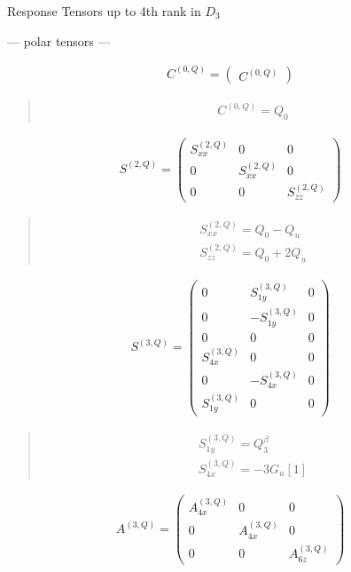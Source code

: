 \documentclass[fleqn,10pt]{jsarticle}
\begin{document}
\setcounter{MaxMatrixCols}{16}

\begin{center}
\LARGE
Response Tensors up to 4th rank in $D_{3}$
\end{center}
\begin{center}\LARGE --- polar tensors ---\end{center}
\begin{align*}
C^{(0,Q)} = \begin{pmatrix} C^{(0,Q)} \end{pmatrix}
\end{align*}
\begin{quote}
\begin{align*}
& C^{(0,Q)} = Q_{0}
\end{align*}
\end{quote}
\begin{align*}
S^{(2,Q)} = \begin{pmatrix} S^{(2,Q)}_{xx} & 0 & 0 \\ 0 & S^{(2,Q)}_{xx} & 0 \\ 0 & 0 & S^{(2,Q)}_{zz} \end{pmatrix}
\end{align*}
\begin{quote}
\begin{align*}
& S^{(2,Q)}_{xx} = Q_{0} - Q_{u} \\
& S^{(2,Q)}_{zz} = Q_{0} + 2 Q_{u}
\end{align*}
\end{quote}
\begin{align*}
S^{(3,Q)} = \begin{pmatrix} 0 & S^{(3,Q)}_{1y} & 0 \\ 0 & - S^{(3,Q)}_{1y} & 0 \\ 0 & 0 & 0 \\ S^{(3,Q)}_{4x} & 0 & 0 \\ 0 & - S^{(3,Q)}_{4x} & 0 \\ S^{(3,Q)}_{1y} & 0 & 0 \end{pmatrix}
\end{align*}
\begin{quote}
\begin{align*}
& S^{(3,Q)}_{1y} = Q_{3}^{\beta} \\
& S^{(3,Q)}_{4x} = - 3 G_{u}[1]
\end{align*}
\end{quote}
\begin{align*}
A^{(3,Q)} = \begin{pmatrix} A^{(3,Q)}_{4x} & 0 & 0 \\ 0 & A^{(3,Q)}_{4x} & 0 \\ 0 & 0 & A^{(3,Q)}_{6z} \end{pmatrix}
\end{align*}
\end{document}
